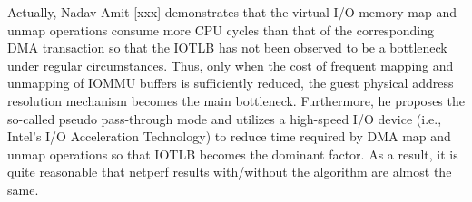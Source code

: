 Actually, Nadav Amit [xxx] demonstrates that the virtual I/O memory map and unmap operations consume more CPU cycles than  that of the corresponding DMA transaction so that the IOTLB has not been observed to be a bottleneck under regular circumstances. Thus, only when the cost of frequent mapping and unmapping of IOMMU buffers is sufficiently reduced, the guest physical address resolution mechanism becomes the main bottleneck. Furthermore, he proposes the so-called pseudo pass-through mode and utilizes a high-speed I/O device (i.e., Intel’s I/O Acceleration Technology) to reduce time required by DMA map and unmap operations so that IOTLB becomes the dominant factor. As a result, it is quite reasonable that netperf results with/without the algorithm are almost the same.








